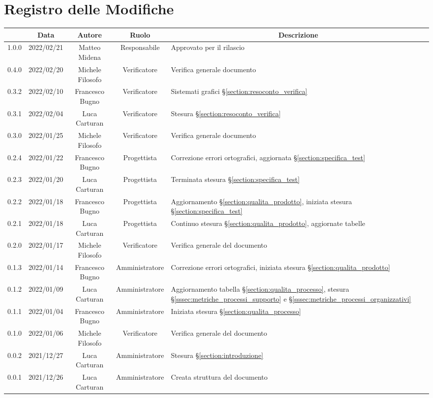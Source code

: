 \thispagestyle{empty}
\section*{Registro delle Modifiche}

\begin{center}
	\renewcommand{\arraystretch}{1.8}
	\begin{longtable}[c]{c | c | c | c | p{5cm}}
		\rowcolor[HTML]{125E28}
		\multicolumn{1}{c}{\color[HTML]{FFFFFF} \textbf{Versione}} & 
		\multicolumn{1}{c}{\color[HTML]{FFFFFF} \textbf{Data}} & 
		\multicolumn{1}{c}{\color[HTML]{FFFFFF} \textbf{Autore}} & 
		\multicolumn{1}{c}{\color[HTML]{FFFFFF} \textbf{Ruolo}} & 
		\multicolumn{1}{c}{\color[HTML]{FFFFFF} \textbf{Descrizione}} \\
		\endhead
		1.0.0 & 2022/02/21 & Matteo Midena & Responsabile & Approvato per il rilascio\\
		0.4.0 & 2022/02/20 & Michele Filosofo & Verificatore & Verifica generale documento\\
		0.3.2 & 2022/02/10 & Francesco Bugno & Verificatore & Sistemati grafici §\ref{section:resoconto_verifica}\\
		0.3.1 & 2022/02/04 & Luca Carturan & Verificatore & Stesura §\ref{section:resoconto_verifica}\\
		0.3.0 & 2022/01/25 & Michele Filosofo & Verificatore & Verifica generale documento\\
		0.2.4 & 2022/01/22 & Francesco Bugno & Progettista & Correzione errori ortografici, aggiornata §\ref{section:specifica_test}\\
		0.2.3 & 2022/01/20 & Luca Carturan & Progettista & Terminata stesura §\ref{section:specifica_test}\\
		0.2.2 & 2022/01/18 & Francesco Bugno & Progettista & Aggiornamento §\ref{section:qualita_prodotto}, iniziata stesura §\ref{section:specifica_test}\\
		0.2.1 & 2022/01/18 & Luca Carturan & Progettista & Continuo stesura §\ref{section:qualita_prodotto}, aggiornate tabelle\\
		0.2.0 & 2022/01/17 & Michele Filosofo & Verificatore & Verifica generale del documento\\
		0.1.3 & 2022/01/14 & Francesco Bugno & Amministratore & Correzione errori ortografici, iniziata stesura §\ref{section:qualita_prodotto}\\
		0.1.2 & 2022/01/09 & Luca Carturan & Amministratore & Aggiornamento tabella §\ref{section:qualita_processo}, stesura §\ref{sssec:metriche_processi_supporto} e §\ref{sssec:metriche_processi_organizzativi}\\
		0.1.1 & 2022/01/04 & Francesco Bugno & Amministratore & Iniziata stesura §\ref{section:qualita_processo}\\
		0.1.0 & 2022/01/06 & Michele Filosofo & Verificatore & Verifica generale del documento \\
		0.0.2 & 2021/12/27 & Luca Carturan & Amministratore & Stesura §\ref{section:introduzione}\\
		0.0.1 & 2021/12/26 & Luca Carturan & Amministratore & Creata struttura del documento
	\end{longtable}
\end{center}